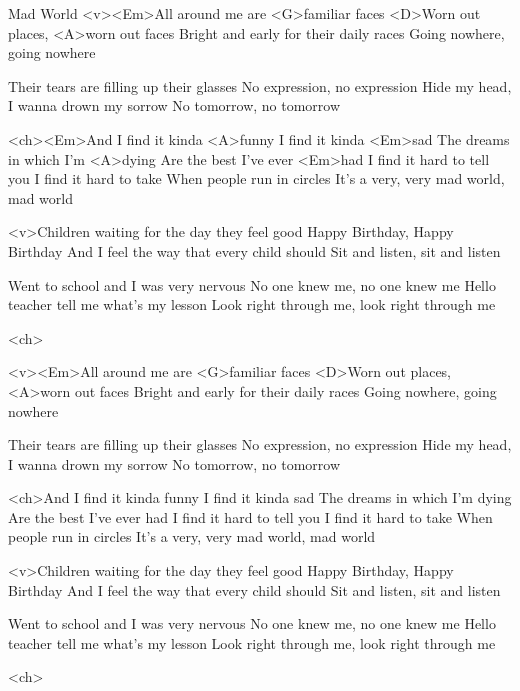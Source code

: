


	\begin{song}[TheAuthor]{Mad World}
		<v><Em>All around me are <G>familiar faces
		<D>Worn out places, <A>worn out faces
		Bright and early for their daily races
		Going nowhere, going nowhere
			
		Their tears are filling up their glasses
		No expression, no expression
		Hide my head, I wanna drown my sorrow
		No tomorrow, no tomorrow

		<ch><Em>And I find it kinda <A>funny
		I find it kinda <Em>sad
		The dreams in which I'm <A>dying
		Are the best I've ever <Em>had
		I find it hard to tell you
		I find it hard to take
		When people run in circles
		It's a very, very mad world, mad world

		<v>Children waiting for the day they feel good
		Happy Birthday, Happy Birthday
		And I feel the way that every child should
		Sit and listen, sit and listen

		Went to school and I was very nervous
		No one knew me, no one knew me
		Hello teacher tell me what's my lesson
		Look right through me, look right through me

		<ch>
	\end{song}
	\begin{song}
		<v><Em>All around me are <G>familiar faces
		<D>Worn out places, <A>worn out faces
		Bright and early for their daily races
		Going nowhere, going nowhere
			
		Their tears are filling up their glasses
		No expression, no expression
		Hide my head, I wanna drown my sorrow
		No tomorrow, no tomorrow

		<ch>And I find it kinda funny
		I find it kinda sad
		The dreams in which I'm dying
		Are the best I've ever had
		I find it hard to tell you
		I find it hard to take
		When people run in circles
		It's a very, very mad world, mad world

		<v>Children waiting for the day they feel good
		Happy Birthday, Happy Birthday
		And I feel the way that every child should
		Sit and listen, sit and listen

		Went to school and I was very nervous
		No one knew me, no one knew me
		Hello teacher tell me what's my lesson
		Look right through me, look right through me

		<ch>
	\end{song}


